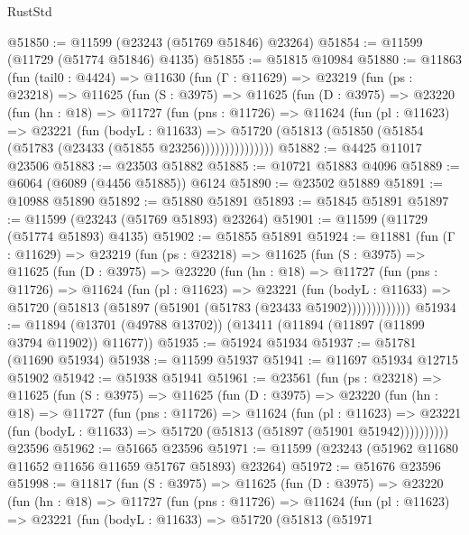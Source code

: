 \begin{lexlean}{RustStd}
\begin{coremodule}
@51850 := @11599 (@23243 (@51769 @51846) @23264)
@51854 := @11599 (@11729 (@51774 @51846) @4135)
@51855 := @51815 @10984
@51880 := @11863
    (fun (tail0 : @4424) =>
    @11630
      (fun (Γ : @11629) =>
      @23219
        (fun (ps : @23218) =>
        @11625
          (fun (S : @3975) =>
          @11625
            (fun (D : @3975) =>
            @23220
              (fun (hn : @18) =>
              @11727
                (fun (pns : @11726) =>
                @11624
                  (fun (pl : @11623) =>
                  @23221
                    (fun (bodyL : @11633) =>
                    @51720 (@51813 (@51850 (@51854 (@51783 (@23433 (@51855 @23256)))))))))))))))
@51882 := @4425 @11017 @23506
@51883 := @23503 @51882
@51885 := @10721 @51883 @4096
@51889 := @6064 (@6089 (@4456 @51885)) @6124
@51890 := @23502 @51889
@51891 := @10988 @51890
@51892 := @51880 @51891
@51893 := @51845 @51891
@51897 := @11599 (@23243 (@51769 @51893) @23264)
@51901 := @11599 (@11729 (@51774 @51893) @4135)
@51902 := @51855 @51891
@51924 := @11881
    (fun (Γ : @11629) =>
    @23219
      (fun (ps : @23218) =>
      @11625
        (fun (S : @3975) =>
        @11625
          (fun (D : @3975) =>
          @23220
            (fun (hn : @18) =>
            @11727
              (fun (pns : @11726) =>
              @11624
                (fun (pl : @11623) =>
                @23221
                  (fun (bodyL : @11633) =>
                  @51720 (@51813 (@51897 (@51901 (@51783 (@23433 @51902)))))))))))))
@51934 := @11894 (@13701 (@49788 @13702)) (@13411 (@11894 (@11897 (@11899 @3794 @11902)) @11677))
@51935 := @51924 @51934
@51937 := @51781 (@11690 @51934)
@51938 := @11599 @51937
@51941 := @11697 @51934 @12715 @51902
@51942 := @51938 @51941
@51961 := @23561
    (fun (ps : @23218) =>
    @11625
      (fun (S : @3975) =>
      @11625
        (fun (D : @3975) =>
        @23220
          (fun (hn : @18) =>
          @11727
            (fun (pns : @11726) =>
            @11624
              (fun (pl : @11623) =>
              @23221 (fun (bodyL : @11633) => @51720 (@51813 (@51897 (@51901 @51942))))))))))
    @23596
@51962 := @51665 @23596
@51971 := @11599 (@23243 (@51962 @11680 @11652 @11656 @11659 @51767 @51893) @23264)
@51972 := @51676 @23596
@51998 := @11817
    (fun (S : @3975) =>
    @11625
      (fun (D : @3975) =>
      @23220
        (fun (hn : @18) =>
        @11727
          (fun (pns : @11726) =>
          @11624
            (fun (pl : @11623) =>
            @23221
              (fun (bodyL : @11633) =>
              @51720
                (@51813
                  (@51971

\end{coremodule}
\end{lexlean}
